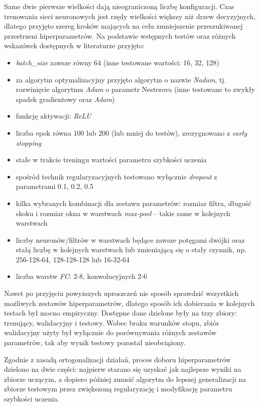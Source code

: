 Same dwie pierwsze wielkości dają nieograniczoną liczbę konfiguracji. 
Czas trenowania sieci neuronowych jest rzędy wielkości większy niż drzew decyzyjnych, dlatego przyjęto szereg kroków mających na celu zmniejszenie przeszukiwanej przestrzeni hiperparametrów. Na podstawie wstępnych testów oraz różnych wskazówek dostępnych w literaturze przyjęto:
\begin{itemize}
	\item \textit{batch\_size} zawsze równy 64 (inne testowane wartości: 16, 32, 128)
	\item za algorytm optymalizacyjny przyjęto algorytm o nazwie \textit{Nadam}, tj. rozwinięcie algorytmu \textit{Adam} o parametr Nesterova (inne testowane to zwykły spadek gradientowy oraz \textit{Adam})
	\item funkcję aktywacji: \textit{ReLU}
	\item liczba epok równa 100 lub 200 (lub mniej do testów), zrezygnowano z \textit{early stopping}
	\item stałe w trakcie treningu wartości parametru szybkości uczenia 
	\item spośród technik regularyzacyjnych testowano wyłącznie \textit{dropout} \cite{srivastava14} z parametrami 0.1, 0.2, 0.5
	\item kilka wybranych kombinacji dla zestawu parametrów: rozmiar filtra, długość skoku i rozmiar okna w warstwach \textit{max-pool} -- takie same w kolejnych warstwach
	\item liczby neuronów/filtrów w warstwach będące zawsze potęgami dwójki oraz stałą liczbę w kolejnych warstwach lub zmieniającą się o stały czynnik, np. 256-128-64, 128-128-128 lub 16-32-64
	\item liczba warstw \textit{FC}: 2-8, konwolucyjnych 2-6
\end{itemize}

Nawet po przyjęciu powyższych uproszczeń nie sposób sprawdzić wszystkich możliwych zestawów hiperparametrów, dlatego sposób ich dobierania w kolejnych testach był mocno empiryczny. 
Dostępne dane dzielone były na trzy zbiory: trenujący, walidacyjny i testowy. Wobec braku warunków stopu, zbiór walidacyjny użyty był wyłącznie do porównywania różnych zestawów parametrów, tak aby wynik testowy pozostał nieobciążony.

Zgodnie z zasadą ortogonalizacji działań, proces doboru hiperparametrów dzielono na dwie części: najpierw starano się uzyskać jak najlepsze wyniki na zbiorze uczącym, a dopiero później zmusić algorytm do lepszej generalizacji na zbiorze testowym przez zwiększoną regularyzację i modyfikację parametru szybkości uczenia. 







%
%


